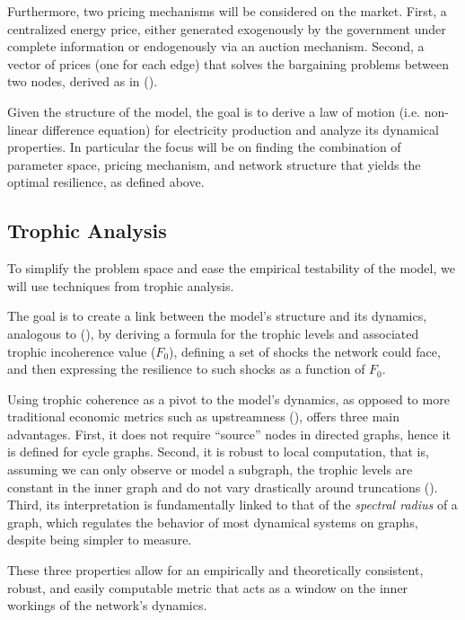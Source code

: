 \documentclass[american]{scrartcl}
\begin{document}
Furthermore, two pricing mechanisms will be considered on the market. First, a centralized energy price, either generated exogenously by the government under complete information or endogenously via an auction mechanism. Second, a vector of prices (one for each edge) that solves the bargaining problems between two nodes, derived as in \citeauthor{Bedayo2016} (\citeyear{Bedayo2016}). %

Given the structure of the model, the goal is to derive a law of motion (i.e. non-linear difference equation) for electricity production and analyze its dynamical properties. In particular the focus will be on finding the combination of parameter space, pricing mechanism, and network structure that yields the optimal resilience, as defined above.

\subsection{Trophic Analysis}

To simplify the problem space and ease the empirical testability of the model, we will use techniques from trophic analysis.

The goal is to create a link between the model's structure and its dynamics, analogous to \citeauthor{MacKay2020} (\citeyear[p.~19]{MacKay2020}), by deriving a formula for the trophic levels and associated trophic incoherence value ($F_0$), defining a set of shocks the network could face, and then expressing the resilience to such shocks as a function of $F_0$.

Using trophic coherence as a pivot to the model's dynamics, as opposed to more traditional economic metrics such as upstreamness (\cite{Antrs2012}), offers three main advantages. First, it does not require ``source'' nodes in directed graphs, hence it is defined for cycle graphs. Second, it is robust to local computation, that is, assuming we can only observe or model a subgraph, the trophic levels are constant in the inner graph and do not vary drastically around truncations (\cite[p.~19]{MacKay2020}). Third, its interpretation is fundamentally linked to that of the \textit{spectral radius} of a graph, which regulates the behavior of most dynamical systems on graphs, despite being simpler to measure.

These three properties allow for an empirically and theoretically consistent, robust, and easily computable metric that acts as a window on the inner workings of the network's dynamics.
\end{document}

